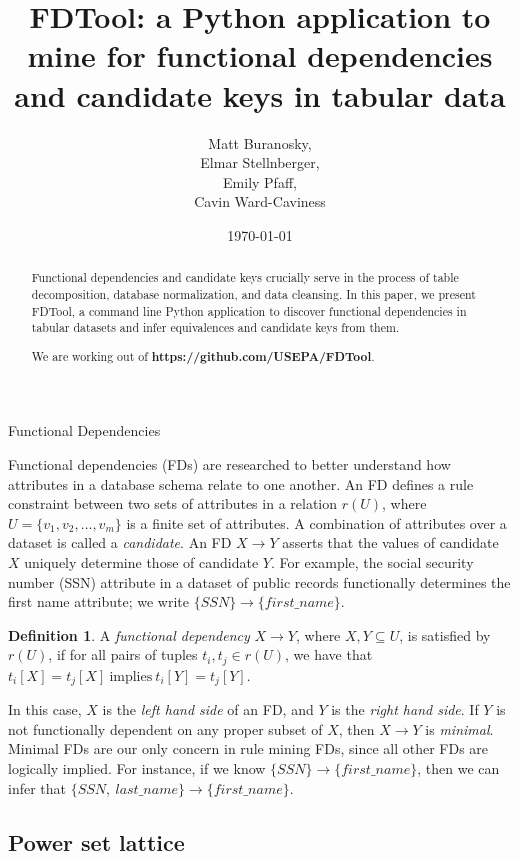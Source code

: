 \documentclass[6pt,twoside]{article}
\title{FDTool: a Python application to mine for functional dependencies and candidate keys in tabular data}
\author{Matt Buranosky, \\
Elmar Stellnberger, \\
Emily Pfaff, \\
Cavin Ward-Caviness}
\date{\today}
\theoremstyle{plain}
\theoremstyle{definition}
\newtheorem{defn}{Definition}[section]
\begin{document}
\maketitle
\begin{abstract}
Functional dependencies and candidate keys crucially serve in the process of table decomposition, database  normalization, and data cleansing. In this paper, we present FDTool, a command line Python application to discover functional dependencies in tabular datasets and infer equivalences and candidate keys from them. 

\bigskip
\noindent
We are working out of  \textbf{https://github.com/USEPA/FDTool}.
\end{abstract}

\begin{section}{Functional Dependencies}

Functional dependencies (FDs) are researched to better understand how attributes in a database schema relate to one another. An FD defines a rule constraint between two sets of attributes in a relation $r(U)$, where $U = \{ v_1, v_2, \ldots, v_m \}$ is a finite set of attributes. A combination of attributes over a dataset is called a \textit{candidate}. An FD $X \rightarrow Y$ asserts that the values of candidate $X$ uniquely determine those of candidate $Y$. For example, the social security number (SSN) attribute in a dataset of public records functionally determines the first name attribute; we write $\{SSN\} \rightarrow \{first\text{\_}name\}$.

\begin{defn}
A \textit{functional dependency} $X \rightarrow Y$, where $X, Y \subseteq U$, is satisfied by $r(U)$, if for all pairs of tuples $t_i, t_j \in r(U)$, we have that $t_i\left[X\right]=t_j\left[X\right] \  \text{implies} \ t_i\left[Y\right]=t_j\left[Y\right]$. 
\end{defn}

 In this case, $X$ is the \textit{left hand side} of an FD, and $Y$ is the \textit{right hand side}. If $Y$ is not functionally dependent on any proper subset of $X$, then $X \rightarrow Y$ is \textit{minimal}. Minimal FDs are our only concern in rule mining FDs, since all other FDs are logically implied. For instance, if we know $\{SSN\} \rightarrow \{first\text{\_}name\}$, then we can infer that $\{SSN,\  last\text{\_}name\} \rightarrow \{first\text{\_}name\}$. 

\subsection[Power set lattice]{Power set lattice}


\end{section}
\end{document}
